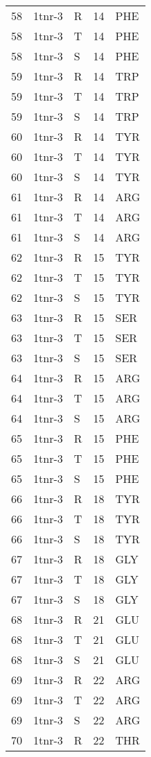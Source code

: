 \begin{longtable}[l]{l|l|l|l|l}
	58 & 1tnr-3 & R & 14 & PHE \\
	58 & 1tnr-3 & T & 14 & PHE \\
	58 & 1tnr-3 & S & 14 & PHE \\
	59 & 1tnr-3 & R & 14 & TRP \\
	59 & 1tnr-3 & T & 14 & TRP \\
	59 & 1tnr-3 & S & 14 & TRP \\
	60 & 1tnr-3 & R & 14 & TYR \\
	60 & 1tnr-3 & T & 14 & TYR \\
	60 & 1tnr-3 & S & 14 & TYR \\
	61 & 1tnr-3 & R & 14 & ARG \\
	61 & 1tnr-3 & T & 14 & ARG \\
	61 & 1tnr-3 & S & 14 & ARG \\
	62 & 1tnr-3 & R & 15 & TYR \\
	62 & 1tnr-3 & T & 15 & TYR \\
	62 & 1tnr-3 & S & 15 & TYR \\
	63 & 1tnr-3 & R & 15 & SER \\
	63 & 1tnr-3 & T & 15 & SER \\
	63 & 1tnr-3 & S & 15 & SER \\
	64 & 1tnr-3 & R & 15 & ARG \\
	64 & 1tnr-3 & T & 15 & ARG \\
	64 & 1tnr-3 & S & 15 & ARG \\
	65 & 1tnr-3 & R & 15 & PHE \\
	65 & 1tnr-3 & T & 15 & PHE \\
	65 & 1tnr-3 & S & 15 & PHE \\
	66 & 1tnr-3 & R & 18 & TYR \\
	66 & 1tnr-3 & T & 18 & TYR \\
	66 & 1tnr-3 & S & 18 & TYR \\
	67 & 1tnr-3 & R & 18 & GLY \\
	67 & 1tnr-3 & T & 18 & GLY \\
	67 & 1tnr-3 & S & 18 & GLY \\
	68 & 1tnr-3 & R & 21 & GLU \\
	68 & 1tnr-3 & T & 21 & GLU \\
	68 & 1tnr-3 & S & 21 & GLU \\
	69 & 1tnr-3 & R & 22 & ARG \\
	69 & 1tnr-3 & T & 22 & ARG \\
	69 & 1tnr-3 & S & 22 & ARG \\
	70 & 1tnr-3 & R & 22 & THR \\

\end{longtable}
